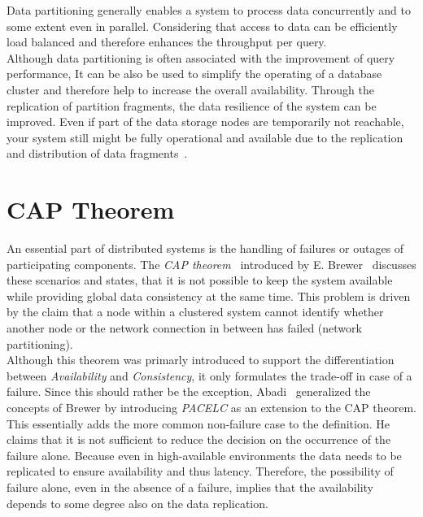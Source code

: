 Data partitioning generally enables a system to process data concurrently and 
to some extent even in parallel. Considering that access to data can be 
efficiently load balanced and therefore enhances the throughput per query.\\

Although data partitioning is often associated with the improvement of query performance,
It can be also be used to simplify the operating of a database cluster and therefore help 
to increase the overall availability.
Through the replication of partition fragments, the data resilience of the system
can be improved. Even if part of the data storage nodes are temporarily not 
reachable, your system still might be fully operational and available due to the 
replication and distribution of data fragments~\cite{dbre2017}.







\section{CAP Theorem}
\label{sec:cap}
An essential part of distributed systems is the handling of failures or outages of participating components. 
The \emph{CAP theorem}~\cite{cap2002} introduced by E. Brewer~\cite{brewer:2000} discusses these scenarios and states, that it is not possible 
to keep the system available while providing global data consistency at the same time.
This problem is driven by the claim that a node within a clustered system cannot identify whether another node or the 
network connection in between has failed (network partitioning).\\
Although this theorem was primarly introduced to support the differentiation between \emph{Availability} and \emph{Consistency}, 
it only formulates the trade-off in case of a failure.
Since this should rather be the exception, Abadi~\cite{abadi2012} generalized the concepts of Brewer by introducing \emph{PACELC} as an extension to the CAP theorem.
This essentially adds the more common non-failure case to the definition.
He claims that it is not sufficient to reduce the decision on the occurrence of the failure alone. 
Because even in high-available environments the data needs to be replicated to ensure availability and thus latency. 
Therefore, the possibility of failure alone, even in the absence of a failure, implies that the availability depends to some degree also on the data replication.


